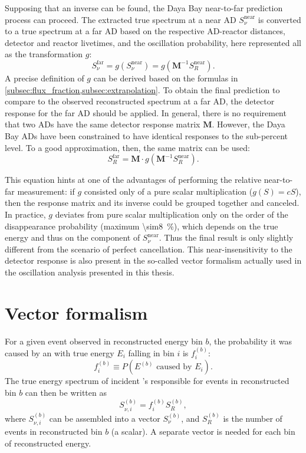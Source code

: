 Supposing that an inverse can be found,
the Daya Bay near-to-far prediction process can proceed.
The extracted true spectrum at a near AD $S_\nu^{\text{near}}$
is converted to a true spectrum at a far AD
based on the respective AD-reactor distances, detector and reactor livetimes,
and the oscillation probability, here represented all as
the transformation $g$:
\begin{equation}\label{eq:drm_trad_transform}
    S_\nu^{\text{far}} = g(S_\nu^{\text{near}}) = g(\mathbf{M}^{-1}S_R^{\text{near}}).
\end{equation}
A precise definition of $g$ can be derived based on the formulas in
\cref{subsec:flux_fraction,subsec:extrapolation}.
To obtain the final prediction to compare
to the observed reconstructed spectrum at a far AD,
the detector response for the far AD should be applied.
In general, there is no requirement that two ADs
have the same detector response matrix $\mathbf{M}$.
However, the Daya Bay ADs have been constrained to have
identical responses to the sub-percent level.
To a good approximation, then, the same matrix can be used:
\begin{equation}\label{eq:drm_trad_final}
    S_R^{\text{far}} = \mathbf{M} \cdot g(\mathbf{M}^{-1}S_R^{\text{near}}).
\end{equation}

This equation hints at one of the advantages of
performing the relative near-to-far measurement:
if $g$ consisted only of a pure scalar multiplication ($g(S) = cS$),
then the response matrix and its inverse could be grouped together
and canceled.
In practice, $g$ deviates from pure scalar multiplication
only on the order of the disappearance probability
(maximum \SI{\sim8}{\percent}),
which depends on the true \nuebar{} energy and thus on the component of
$S_\nu^{\text{near}}$.
Thus the final result is only slightly different from
the scenario of perfect cancellation.
This near-insensitivity to the detector response is also present
in the so-called vector formalism
actually used in the oscillation analysis presented in this thesis.

\section{Vector formalism}
\label{sec:drm_lbnl}

For a given event observed in reconstructed energy bin $b$,
the probability it was caused by an \nuebar{} with true energy $E_i$
falling in bin $i$ is $f_i^{(b)}$:
\begin{equation}\label{eq:drm_lbnl_prob}
    f_i^{(b)} \equiv P(E^{(b)} \text{ caused by } E_i).
\end{equation}
The true energy spectrum of incident \nuebar{}'s responsible for
events in reconstructed bin $b$ can then be written as
\begin{equation}\label{eq:drm_lbnl_spec}
    S_{\nu,i}^{(b)} = f_i^{(b)} S_R^{(b)},
\end{equation}
where $S_{\nu,i}^{(b)}$ can be assembled into a vector $S_\nu^{(b)}$,
and $S_R^{(b)}$ is the number of events in reconstructed bin $b$ (a scalar).
A separate vector is needed for each bin of reconstructed energy.

